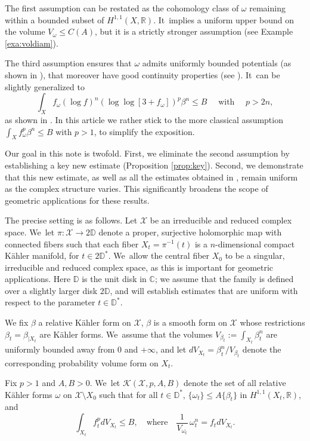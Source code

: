 \documentclass[JEP,XML,SOM,Unicode,published]{cedram}
\theoremstyle{definition}
\newcommand{\C}{\mathbb C}
\newcommand{\R}{\mathbb R}
\begin{document}
The first assumption can be restated as the cohomology class of $\omega$ remaining within a bounded subset of $H^{1,1}(X,\R)$. It~implies a uniform upper bound on the volume $V_{\omega} \leq C(A)$, but it is a strictly stronger assumption
(see Example \ref{exa:voldiam}).

The third assumption ensures that $\omega$ admits uniformly bounded potentials
(as shown in \cite{Kol98,EGZ08,DP10}), that moreover
have good continuity properties (see \cite{Kol08,DDGHKZ14,GPTW21,GGZ23}). It~can be slightly generalized to
\[
\int_X f_{\omega} (\log f)^n (\log \log [3+f_{\omega}])^p \beta^n \leq B
\quad \text{ with } \quad
p>2n,
\]
as shown in \cite{GGZ23}. In this article we rather stick to the more classical assumption
$\int_X f_{\omega}^p \beta^n \leq B$ with $p>1$, to simplify the exposition.

Our goal in this note is twofold.
First, we eliminate the second assumption by establishing a key new estimate (Proposition \ref{prop:key}).
Second, we demonstrate that this new estimate, as well as all the estimates obtained in \cite{GPS22,GPSS22,GPSS23},
remain uniform as the complex structure varies.
This significantly broadens the scope of geometric applications for these results.

The precise setting is as follows.
Let $\mathcal{X}$ be an irreducible and reduced complex space. We~let $\pi:{\mathcal X} \rightarrow 2 \mathbb D$
denote a proper, surjective holomorphic map with connected fibers such that each fiber $X_t=\pi^{-1}(t)$ is a $n$-dimensional
compact Kähler manifold, for $t\in 2 \mathbb D^*$. We~allow the central fiber $X_0$ to be a singular, irreducible and reduced complex space, as this is important for geometric applications.
Here $\mathbb D$ is the unit disk in $\C$; we assume that the family is defined over a slightly larger disk
$2 \mathbb D$, and will establish estimates that are uniform with respect to the parameter $t \in \mathbb D^*$.

We fix $\beta$ a relative Kähler form on $\mathcal{X}$, \ie
$\beta$ is a smooth form on $\mathcal{X}$ whose restrictions $\beta_t=\beta_{|X_t}$ are Kähler forms. We~assume that the volumes $V_{\beta_t}:=\int_{X_t} \beta_t^n$ are uniformly bounded away from 0 and $+ \infty $, and let $dV_{X_t}=\beta_t^n /V_{\beta_t}$ denote the corresponding probability volume form on $X_t$.

Fix $p>1$ and $A,B>0$. We~let ${\mathcal K}(\mathcal{X},p,A,B)$ denote the set of all relative Kähler forms $\omega$ on
$\mathcal{X}\setminus X_0 $ such that for all $t \in \mathbb D^*$, $\{\omega_t\}\leq A\{\beta_t\}$ in $H^{1,1}(X_t,\R)$, and\vspace*{-3pt}
\[
\int_{X_t} f_t^p dV_{X_t} \leq B,
\quad \text{where} \quad
\frac{1}{V_{\omega_t}}\, \omega_t^n=f_t dV_{X_t}.
\]
\end{document}
